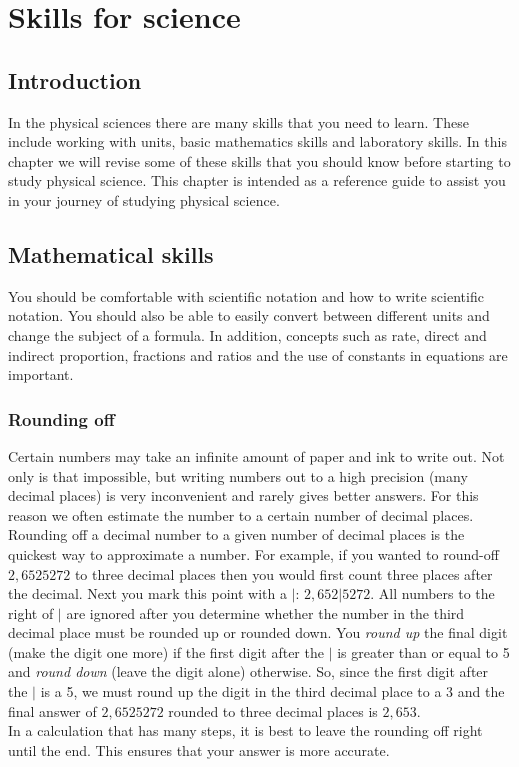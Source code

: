         \chapter{Skills for science}
    \setcounter{figure}{1}\setcounter{subfigure}{1}\label{m30853}
    \section{Introduction}
            \nopagebreak
In the physical sciences there are many skills that you need to learn. These include working with units, basic mathematics skills and laboratory skills. In this chapter we will revise some of these skills that you should know before starting to study physical science. This chapter is intended as a reference guide to assist you in your journey of studying physical science. 


\section{Mathematical skills}
You should be comfortable with scientific notation and how to write scientific notation. You should also be able to easily convert between different units and change the subject of a formula. In addition, concepts such as rate, direct and indirect proportion, fractions and ratios and the use of constants in equations are important. 
\subsection*{Rounding off}
Certain numbers may take an infinite amount of paper and ink to write out. Not only is that impossible, but writing numbers out to a high precision (many decimal places) is very inconvenient and rarely gives better answers. For this reason we often estimate the number to a certain number of decimal places. \\
Rounding off a decimal number to a given number of decimal places is the quickest way to approximate a number. For example, if you wanted to round-off $2,6525272$ to three decimal places then you would first count three places after the decimal. Next you mark this point with a $|$: $2,652|5272$. All numbers to the right of $|$ are ignored after you determine whether the number in the third decimal place must be rounded up or rounded down. You \textsl{round up} the final digit (make the digit one more) if the first digit after the $|$ is greater than or equal to 5 and \textsl{round down} (leave the digit alone) otherwise. So, since the first digit after the $|$ is a 5, we must round up the digit in the third decimal place to a 3 and the final answer of $2,6525272$ rounded to three decimal places is $2,653$. \\
In a calculation that has many steps, it is best to leave the rounding off right until the end. This ensures that your answer is more accurate.

